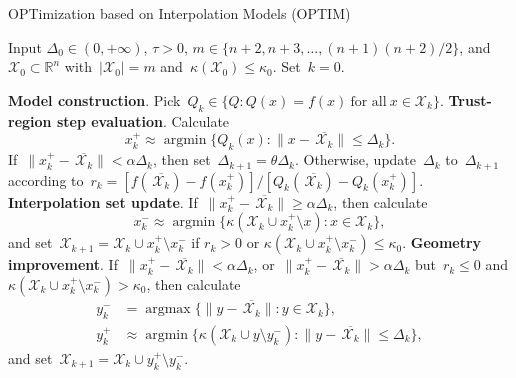 \documentclass[11pt,a4paper,draft]{article}  %
\theoremstyle{definition}
\numberwithin{equation}{section}
\newcommand{\mbar}[1]{\,\overline{\!\!{#1}\!}} %
\DeclareMathOperator*{\argmax}{argmax}
\DeclareMathOperator*{\argmin}{argmin}
\newcommand{\RR}{\mathbb{R}}
\newcommand{\Int}{\mathcal{X}}
\newcommand{\sss}[1]{{\scriptscriptstyle{#1}}}
\newcommand{\get}{{\sss{+}}}
\newcommand{\drop}{{\sss{-}}}
\begin{document}
\begin{algorithm}[htbp!]
    \caption{\label{alg:optim}OPTimization based on Interpolation Models (OPTIM)}
    Input $\Delta_0\in (0,+\infty)$, $\tau>0$, $m\in \{n+2, n+3, \dots, (n+1)(n+2)/2\}$,
    and~$\Int_0\subset \RR^n$ with~$|\Int_0|=m$ and~$\kappa(\Int_0) \le \kappa_0$.
    Set~$k=0$.
    \begin{algorithmic}[1]
        \State \textbf{Model construction}.
        Pick~$Q_k \in \{Q \mathrel{:} Q(x)=f(x)~\text{for all}~x\in\Int_k\}$.
        \State \textbf{Trust-region step evaluation}.
        Calculate
        \begin{equation}
         \label{eq:xget}
         x_k^\get \approx \argmin\{Q_k(x)\mathrel{:} \|x-\mbar{\Int_k}\|\le \Delta_k\}.
        \end{equation}
        If~$\|x_k^\get-\mbar{\Int_k}\| < \alpha\Delta_k$, then set~$\Delta_{k+1} = \theta \Delta_k$.
        Otherwise,
        update~$\Delta_k$ to~$\Delta_{k+1}$ according to~$r_k = [f(\mbar{\Int_k})
        - f(x_k^\get)]/[Q_k(\mbar{\Int_k}) - Q_k(x_k^\get)]$.
        \State \textbf{Interpolation set update}.
        If~$\|x_k^\get-\mbar{\Int_k}\| \ge \alpha\Delta_k$, then calculate
        \begin{equation}
            \label{eq:xdrop}
            x_k^\drop \approx \argmin\{\kappa(\Int_k\cup x_k^\get\setminus x) \mathrel{:} x \in
            \Int_k\},
        \end{equation}
        and set~$\Int_{k+1} = \Int_k\cup x_k^\get\setminus x_k^\drop$
        if $r_k>0$ or $\kappa(\Int_k\cup x_k^\get \setminus x_k^\drop) \le \kappa_0$.
        \State \textbf{Geometry improvement}.
        If~$\|x_k^\get-\mbar{\Int_k}\|< \alpha \Delta_k$, or~$\|x_k^\get-\mbar{\Int_k}\| > \alpha \Delta_k$
        but~$r_k\le 0$ and $\kappa(\Int_k \cup x_k^\get\setminus x_k^\drop) > \kappa_0$, then calculate
          \begin{align}
              \label{eq:ydrop}
              y_k^\drop &= \argmax\{\|y-\mbar{\Int_k}\| \mathrel{:} y \in \Int_k\}, \\
              \label{eq:yget}
              y_k^\get &\approx \argmin\{\kappa(\Int_k \cup y \setminus y_k^\drop) \mathrel{:}
                  \|y-\mbar{\Int_k}\|\le
              \Delta_k\},
          \end{align}
       and set~$\Int_{k+1} = \Int_k\cup y_k^\get\setminus y_k^\drop$.
    \end{algorithmic}
\end{algorithm}
\end{document}
